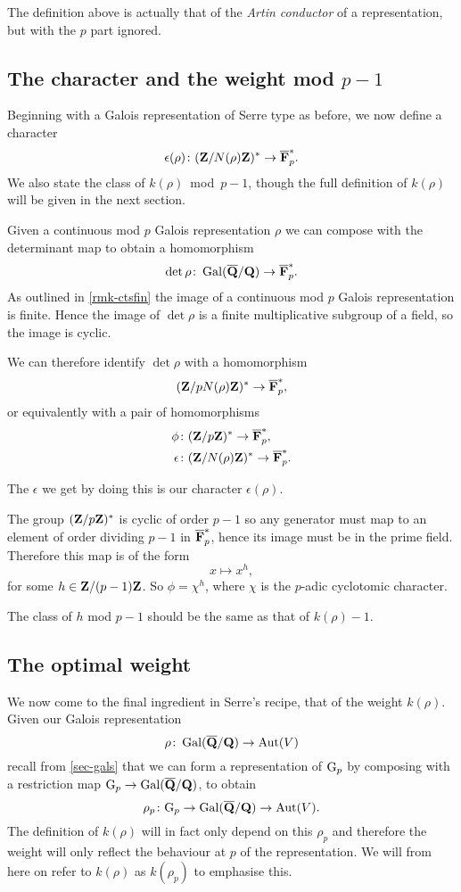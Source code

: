 \documentclass[a4paper,12pt]{article}
\begin{document}
The definition above is actually that of the \emph{Artin conductor} of a representation, but with the $p$ part ignored. %


\subsection{The character and the weight mod $p-1$}
Beginning with a Galois representation of Serre type as before, we now define a character
\[
\epsilon(\rho)\colon  (\mathbf{Z}/N(\rho)\mathbf{Z})^* \to \overline{\mathbf{F}}_p^*.
\]
We also state the class of $k(\rho)$~mod~$p-1$, though the full definition of $k(\rho)$ will be given in the next section.

Given a continuous mod $p$ Galois representation $\rho$ we can compose with the determinant map to obtain a homomorphism
\[
\det \rho\colon \operatorname{Gal}(\overline{\mathbf{Q}}/\mathbf{Q}) \to \overline{\mathbf{F}}_p^*.
\]
As outlined in \cref{rmk-ctsfin} the image of a continuous mod $p$ Galois representation is finite.
Hence the image of $\det \rho$ is a finite multiplicative subgroup of a field, so the image is cyclic.


We can therefore identify $\det\rho$ with a homomorphism
\[
(\mathbf{Z}/pN(\rho)\mathbf{Z})^* \to \overline{\mathbf{F}}_p^*,
\]
or equivalently with a pair of homomorphisms
\begin{align*}
\phi\colon& (\mathbf{Z}/p\mathbf{Z})^* \to \overline{\mathbf{F}}_p^*,\\
\epsilon\colon& (\mathbf{Z}/N(\rho)\mathbf{Z})^* \to \overline{\mathbf{F}}_p^*.
\end{align*}

The $\epsilon$ we get by doing this is our character $\epsilon(\rho)$.

The group $(\mathbf{Z}/p\mathbf{Z})^*$ is cyclic of order $p-1$ so any generator must map to an element of order dividing $p-1$ in $\overline{\mathbf{F}}_p^*$, hence its image must be in the prime field.
Therefore this map is of the form
\[
x \mapsto x^h,
\]
for some $h \in \mathbf{Z}/(p-1)\mathbf{Z}$.
So $\phi = \chi^h$, where $\chi$ is the $p$-adic cyclotomic character. %

The class of $h$ mod $p-1$ should be the same as that of $k(\rho)-1$.



\subsection{The optimal weight}
We now come to the final ingredient in Serre's recipe, that of the weight $k(\rho)$.
Given our Galois representation
\[
\rho \colon \operatorname{Gal}(\overline{\mathbf{Q}}/\mathbf{Q}) \to \operatorname{Aut}(V)
\]
recall from \cref{sec-gals} that we can form a representation of $\mathrm{G}_p$ by composing with a restriction map $\mathrm{G}_p \to\operatorname{Gal}(\overline{\mathbf{Q}}/\mathbf{Q})$, to obtain
\[
\rho_p\colon \mathrm{G}_p \to \operatorname{Gal}(\overline{\mathbf{Q}}/\mathbf{Q}) \to \operatorname{Aut}(V).
\]
The definition of $k(\rho)$ will in fact only depend on this $\rho_p$ and therefore the weight will only reflect the behaviour at $p$ of the representation.
We will from here on refer to $k(\rho)$ as $k(\rho_p)$ to emphasise this.
\end{document}
